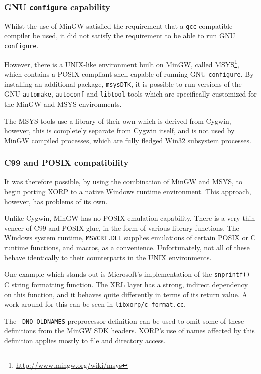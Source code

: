 \documentclass[11pt]{article}
\begin{document}
\subsubsection{GNU {\tt configure} capability}

Whilst the use of MinGW satisfied the requirement that a {\tt gcc}-compatible compiler be used,
it did not satisfy the requirement to be able to run GNU {\tt configure}.

However, there is a UNIX-like environment built on MinGW, called
MSYS\footnote{\url{http://www.mingw.org/wiki/msys}}, which
contains a POSIX-compliant shell capable of running GNU {\tt configure}. By installing
an additional package, {\tt msysDTK}, it is possible to run versions of the GNU
{\tt automake}, {\tt autoconf} and {\tt libtool} tools which are specifically customized for
the MinGW and MSYS environments.

The MSYS tools use a library of their own which is derived from Cygwin, however,
this is completely separate from Cygwin itself, and is not used by MinGW compiled processes,
which are fully fledged Win32 subsystem processes.

\subsubsection{C99 and POSIX compatibility}

It was therefore possible, by using the combination of MinGW and MSYS, to begin
porting XORP to a native Windows runtime environment. This approach,
however, has problems of its own.

Unlike Cygwin, MinGW has no POSIX emulation capability. There is a very thin veneer
of C99 and POSIX glue, in the form of various library functions.
The Windows system runtime, {\tt MSVCRT.DLL} supplies emulations of certain POSIX
or C runtime functions, and macros, as a convenience. Unfortunately, not all of these
behave identically to their counterparts in the UNIX environments.

One example which stands out is Microsoft's implementation of
the {\tt snprintf()} C string formatting function. The XRL layer has a strong, indirect
dependency on this function, and it behaves quite differently in terms of
its return value. A work around for this can be seen in {\tt libxorp/c\_format.cc}.

The {\tt -DNO\_OLDNAMES} preprocessor definition can be used to omit some of these definitions
from the MinGW SDK headers. XORP's use of names affected by this definition applies
mostly to file and directory access.
\end{document}
